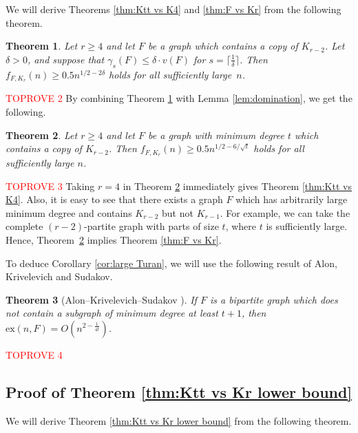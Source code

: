 \documentclass[11pt]{article}
\let\oldendproof\endproof
\renewenvironment{proof}[1][\proofname]{\oldproof[\bf #1]}{\oldendproof}
\theoremstyle{plain}
\newtheorem{theorem}{Theorem}[section]
\theoremstyle{definition}
\newcommand{\ex}{\text{ex}}
\begin{document}
We will derive Theorems \ref{thm:Ktt vs K4} and \ref{thm:F vs Kr} from the following theorem.

\begin{theorem}\label{thm:F vs Kr domination}
    Let $r \geq 4$ and let $F$ be a graph which contains a copy of $K_{r-2}$. Let $\delta > 0$, and suppose that $\gamma_s(F) \leq \delta \cdot v(F)$ for $s = \lceil \frac{1}{\delta} \rceil$. Then $f_{F,K_r}(n) \geq 0.5n^{1/2 - 2\delta}$ holds for all sufficiently large~$n$.
\end{theorem}

\begin{proof}\textcolor{red}{TOPROVE 2}\end{proof}
By combining Theorem \ref{thm:F vs Kr domination} with Lemma \ref{lem:domination}, we get the following. 
\begin{theorem}\label{thm:F vs Kr main}
    Let $r \geq 4$ and let $F$ be a graph with minimum degree $t$ which contains a copy of $K_{r-2}$. Then $f_{F,K_r}(n) \geq 0.5n^{1/2 - 6/\sqrt{t}}$ holds for all sufficiently large $n$.
\end{theorem}
\begin{proof}\textcolor{red}{TOPROVE 3}\end{proof}
Taking $r=4$ in Theorem \ref{thm:F vs Kr main} immediately gives Theorem \ref{thm:Ktt vs K4}. Also, it is easy to see that there exists a graph $F$ which has arbitrarily large minimum degree and contains $K_{r-2}$ but not $K_{r-1}$. For example, we can take the complete $(r-2)$-partite graph with parts of size $t$, where $t$ is sufficiently large. Hence, Theorem~\ref{thm:F vs Kr main} implies Theorem \ref{thm:F vs Kr}.

To deduce Corollary \ref{cor:large Turan}, we will use the following result of Alon, Krivelevich and Sudakov.

\begin{theorem}[Alon--Krivelevich--Sudakov \cite{AKS03}] \label{thm:degeneracy Turan}
    If $F$ is a bipartite graph which does not contain a subgraph of minimum degree at least $t+1$, then $\ex(n,F)=O(n^{2-\frac{1}{4t}})$.
\end{theorem}

\begin{proof}\textcolor{red}{TOPROVE 4}\end{proof}

\subsection{Proof of Theorem \ref{thm:Ktt vs Kr lower bound}}
    We will derive Theorem \ref{thm:Ktt vs Kr lower bound} from the following theorem.
	
\end{document}
